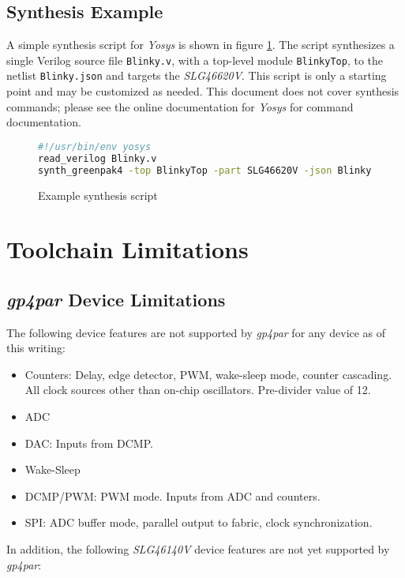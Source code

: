 \documentclass[11pt]{article}
\newcommand{\namestyle}[1]{\textit{#1}}
\begin{document}
\subsection{Synthesis Example}

A simple synthesis script for \namestyle{Yosys} is shown in figure \ref{yscript}. The script synthesizes a single
Verilog source file \texttt{Blinky.v}, with a top-level module \texttt{BlinkyTop}, to the netlist \texttt{Blinky.json}
and targets the \namestyle{SLG46620V}. This script is only a starting point and may be customized as needed. This
document does not cover synthesis commands; please see the online documentation for \namestyle{Yosys} for command
documentation.

\begin{figure}[h]
\begin{lstlisting}[language=sh]
#!/usr/bin/env yosys
read_verilog Blinky.v
synth_greenpak4 -top BlinkyTop -part SLG46620V -json Blinky.json
\end{lstlisting}
\caption{Example synthesis script}
\label{yscript}
\end{figure}

\pagebreak
\section{Toolchain Limitations}
\subsection{\namestyle{gp4par} Device Limitations}

The following device features are not supported by \namestyle{gp4par} for any device as of this writing:

\begin{itemize}
\item Counters: Delay, edge detector, PWM, wake-sleep mode, counter cascading.
All clock sources other than on-chip oscillators. Pre-divider value of 12.
\item ADC
\item DAC: Inputs from DCMP.
\item Wake-Sleep
\item DCMP/PWM: PWM mode. Inputs from ADC and counters.
\item SPI: ADC buffer mode, parallel output to fabric, clock synchronization.
\end{itemize}

In addition, the following \namestyle{SLG46140V} device features are not yet supported by \namestyle{gp4par}:
\end{document}

